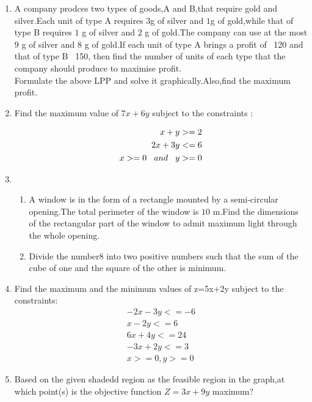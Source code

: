 \documentclass{article}
\begin{document}
\begin{enumerate} 
 \item A company prodces two types of goods,A and B,that require gold and silver.Each unit of type A requires $3$g of silver and $1$g of gold,while that of type B requires $1$ g of silver and $2$ g of gold.The company can use at the most $9$ g of silver and $8$ g of gold.If each unit of  type A brings a profit of \rupee~120 and that of type B \rupee~150, then find the number of units of each type that the company should produce to maximise profit.\\
		Formulate the above LPP and solve it graphically.Also,find the maximum profit.
\item Find the maximum value of $7x+6y$ subject to the constraints :

		\begin{align}
			\text{$x+y>=2$}
			   \\ \text{$2x+3y<=6$}
			   \\ \text{$x>=0$} \hspace{0.3cm}and\hspace{0.3cm} \text{$y>=0$}
		\end{align}
\item \begin{enumerate} %
			\item A window is in the form of a rectangle mounted by a semi-circular opening.The total perimeter of the window is $10$ m.Find the dimensions of the rectangular part of the window to admit maximum light through the whole opening.
			\item Divide the number$8$ into two positive numbers such that the sum of the cube of one and the square of the other is minimum.
	               \end{enumerate}
\item 
 Find the maximum and the minimum values of {z=5x+2y} subject to the constraints:
	\\
	\begin{align}
		    -2x-3y<=-6
		 \\  x-2y<=6
		 \\  6x+4y<=24
		  \\  -3x+2y<=3
		  \\  x>=0,y>=0
	\end{align}
	\item Based on the given shadedd region as the feasible region in the graph,at which point(s) is the objective function $Z=3x+9y$ maximum?
	\begin{figure}[H]

\end{figure}
\end{enumerate}
\end{document}
